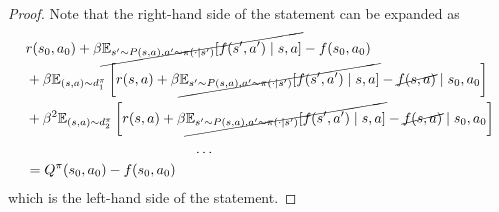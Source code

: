 \begin{proof}
Note that the right-hand side of the statement can be expanded as
\begin{align}
    &r(s_0, a_0)+\beta \cancel{\mathbb{E}_{s^\prime\sim P(s,a), a^\prime\sim \pi(\cdot\mid s^\prime)}[f(s^\prime,a^\prime)\mid s,a]}-f(s_0,a_0)\notag
    \\
    &+\beta\mathbb{E}_{(s,a)\sim d_1^\pi}\left[r(s, a)+\beta \cancel{\mathbb{E}_{s^\prime\sim P(s,a), a^\prime\sim \pi(\cdot\mid s^\prime)}[f(s^\prime,a^\prime)\mid s,a]}-\cancel{f(s,a)}\mid s_0, a_0\right]\notag
    \\
    &+\beta^2\mathbb{E}_{(s,a)\sim d_2^\pi}\left[r(s, a)+\beta \cancel{\mathbb{E}_{s^\prime\sim P(s,a), a^\prime\sim \pi(\cdot\mid s^\prime)}[f(s^\prime,a^\prime)\mid s,a]}-\cancel{f(s,a)}\mid s_0, a_0\right]\notag
    \\&\quad\quad\quad\quad\quad\quad\quad\quad\quad\quad\quad\quad\ldots\notag
    \\
    &=Q^\pi(s_0, a_0)-f(s_0, a_0)\notag
\end{align}
which is the left-hand side of the statement.

\end{proof}

\iffalse

\begin{lem}[Equivalence between Occupancy matching and Behavioral Cloning]
The solution set to the Occupancy matching objective (equation \ref{eq:occupancyObj}) without regularization terms is equivalent to the solution set to the behavioral cloning objective (equation \ref{eq:BC}).
\end{lem}

\begin{proof}
    In proving Lemma \ref{cor:occp=naiveBE}, we saw that $\mathbb{E}_{(s, a) \sim d^\ast}[r(s, a)\mid s_0,a_0]-\mathbb{E}_{(s, a) \sim d^\pi}[r(s, a)\mid s_0,a_0] =(1-\beta)Q^\ast(s_0, a_0)-(1-\beta)Q^\pi(s_0, a_0)$. 

    Now from Lemma \ref{lem:minMLE}, we have 
      \begin{align}
           \underset{Q\in \mathcal{Q}}{\arg\max } &\; \;\mathbb{E}_{(s, a)\sim \pi^*, \nu_0}  \left[\log\left(\hat{p}_{Q}(\;\cdot
    \mid s)\right)\right] \notag
    \\
     &=\left\{Q \in \mathcal{Q} \mid\hat{p}_{Q}(\;\cdot
    \mid s) = \pi^*(\;\cdot
    \mid s)\quad  \forall s\in\bar{\mathcal{S}}\quad\text{a.e.}\right\}\notag
    \\
     &=\left\{Q \in \mathcal{Q} \mid Q(s,a_1)-Q(s,a_2)= Q^*(s,a_1)-Q^*(s,a_2) \quad \forall a_1, a_2\in\mathcal{A}, s\in\bar{\mathcal{S}}\right\} \notag
    \end{align}
This concludes that the solution set to the behavioral cloning objective is equivalent to the occupancy matching objective without the regularization term.
\end{proof}

\fi